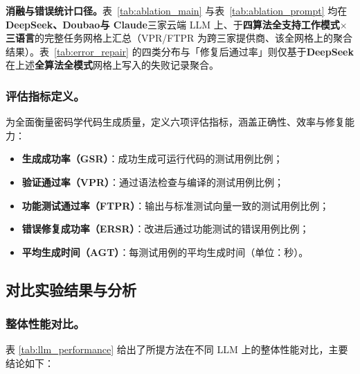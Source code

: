 \documentclass[runningheads]{llncs}
\begin{document}
\textbf{消融与错误统计口径。}表~\ref{tab:ablation_main} 与表~\ref{tab:ablation_prompt} 均在\textbf{DeepSeek、Doubao与 Claude}三家云端 LLM 上、于\textbf{四算法全支持工作模式$\times$三语言}的完整任务网格上汇总（VPR/FTPR 为跨三家提供商、该全网格上的聚合结果）。表~\ref{tab:error_repair} 的四类分布与「修复后通过率」则仅基于\textbf{DeepSeek} 在上述\textbf{全算法全模式}网格上写入的失败记录聚合。

\subsubsection{评估指标定义。}
为全面衡量密码学代码生成质量，定义六项评估指标，涵盖正确性、效率与修复能力：
\begin{itemize}[leftmargin=1.2em, labelsep=0.4em]
  \item \textbf{生成成功率（GSR）}：成功生成可运行代码的测试用例比例；
  \item \textbf{验证通过率（VPR）}：通过语法检查与编译的测试用例比例；
  \item \textbf{功能测试通过率（FTPR）}：输出与标准测试向量一致的测试用例比例；
  \item \textbf{错误修复成功率（ERSR）}：改进后通过功能测试的错误用例比例；
  \item \textbf{平均生成时间（AGT）}：每测试用例的平均生成时间（单位：秒）。
\end{itemize}

\subsection{对比实验结果与分析}
\subsubsection{整体性能对比。}
表 \ref{tab:llm_performance} 给出了所提方法在不同 LLM 上的整体性能对比，主要结论如下：
\end{document}
